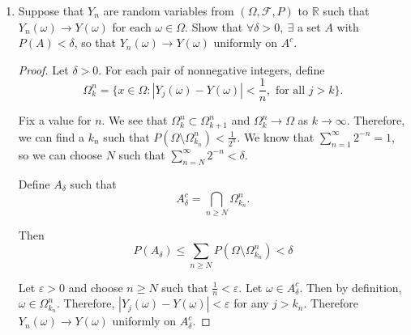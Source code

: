 \documentclass[a4paper]{article}
\newcommand{\R}{\mathbb{R}}
\newcommand{\Q}{\mathbb{Q}}
\begin{document}
\begin{enumerate}
    \begin{proof}

      Assume a distribution function $F$ has uncountably many jump discontinuities. Let $x_\alpha$ be one such point of discontinuity. Then for some
      $\varepsilon > 0$, we have
      \[ F(x_\alpha) - F(x_\alpha-\delta) > \varepsilon \]
      for any $\delta > 0$. By the density of $\Q$ in $\R$, we can find a rational $q_\alpha \in \left( F(x_\alpha) - \varepsilon, F(x_\alpha)
      \right)$. Because $F$ is increasing, there is no $x$ such that $F(x) = q_\alpha$.

      Repeating this process for every jump in $F$ would give a rational number between 0 and 1 for each of the uncountably many jumps in $F$. Because
      $F$ is increasing, each of these rationals would be unique (none of the jumps cover the same values of $F(x)$). Therefore, we would have a way of indexing $\Q$ by an uncountable set, which
      contradicts the countability of $\Q$. Thus, $F$ must only have countably many jumps.

    \end{proof}

  \item
    Suppose that $Y_n$ are random variables from $( \Omega, \mathcal{F}, P )$ to $\R$ such that $Y_n(\omega) \to Y(\omega)$ for each $\omega \in \Omega$. Show that $\forall \delta > 0, \ \exists$ a set $A$ with $P(A) < \delta$, so that $Y_n(\omega) \to Y(\omega)$ uniformly on $A^c$.

    \begin{proof}

      Let $\delta > 0$. For each pair of nonnegative integers, define
      \[ \Omega_k^n = \{ x \in \Omega : |Y_j(\omega) - Y(\omega)| < \frac{1}{n}, \text{ for all } j > k \} .\]

      Fix a value for $n$. We see that $\Omega_k^n \subset \Omega_{k+1}^n$ and $\Omega_k^n \to \Omega$ as $k \to \infty$. Therefore, we can find a
      $k_n$ such that $P(\Omega \setminus \Omega_{k_n}^n) < \frac{1}{2^n}$. We know that $\sum_{n=1}^\infty 2^{-n} = 1$, so we can choose $N$ such that
      $\sum_{n=N}^\infty 2^{-n} < \delta$.

      Define $A_\delta$ such that
      \[ A_\delta^c = \bigcap_{n\geq N} \Omega_{k_n}^n .\]

    Then
    \[ P( A_\delta ) \leq \sum_{n \geq N} P \left( \Omega \setminus \Omega_{k_n}^n \right) < \delta \]

    Let $\varepsilon>0$ and choose $n \geq N$ such that $\frac{1}{n} < \varepsilon$. Let $\omega \in A_\delta^c$. Then by definition, $\omega \in
    \Omega_{k_n}^n$. Therefore, $|Y_j(\omega) - Y(\omega)| < \varepsilon$ for any $j > k_n$. Therefore $Y_n(\omega) \to Y(\omega)$ uniformly on
    $A_\delta^c$.


\end{proof}
\end{enumerate}
\end{document}
